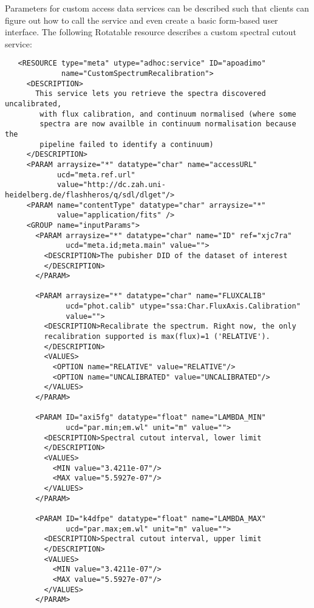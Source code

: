 \documentclass[11pt,a4paper]{ivoa}
\begin{document}
Parameters for custom access data services can be described such that
clients can figure out how to call the service and even create a basic
form-based user interface. The following Rotatable resource describes
a custom spectral cutout service:
{\small
\begin{verbatim}
   <RESOURCE type="meta" utype="adhoc:service" ID="apoadimo" 
             name="CustomSpectrumRecalibration">
     <DESCRIPTION>
       This service lets you retrieve the spectra discovered uncalibrated,
        with flux calibration, and continuum normalised (where some 
        spectra are now availble in continuum normalisation because the 
        pipeline failed to identify a continuum)
     </DESCRIPTION>
     <PARAM arraysize="*" datatype="char" name="accessURL"
            ucd="meta.ref.url"
            value="http://dc.zah.uni-heidelberg.de/flashheros/q/sdl/dlget"/>
     <PARAM name="contentType" datatype="char" arraysize="*" 
            value="application/fits" />
     <GROUP name="inputParams">
       <PARAM arraysize="*" datatype="char" name="ID" ref="xjc7ra"
              ucd="meta.id;meta.main" value="">
         <DESCRIPTION>The pubisher DID of the dataset of interest
         </DESCRIPTION>
       </PARAM>

       <PARAM arraysize="*" datatype="char" name="FLUXCALIB"
              ucd="phot.calib" utype="ssa:Char.FluxAxis.Calibration"
              value="">
         <DESCRIPTION>Recalibrate the spectrum. Right now, the only
         recalibration supported is max(flux)=1 ('RELATIVE').
         </DESCRIPTION>
         <VALUES>
           <OPTION name="RELATIVE" value="RELATIVE"/>
           <OPTION name="UNCALIBRATED" value="UNCALIBRATED"/>
         </VALUES>
       </PARAM>

       <PARAM ID="axi5fg" datatype="float" name="LAMBDA_MIN"
              ucd="par.min;em.wl" unit="m" value="">
         <DESCRIPTION>Spectral cutout interval, lower limit
         </DESCRIPTION>
         <VALUES>
           <MIN value="3.4211e-07"/>
           <MAX value="5.5927e-07"/>
         </VALUES>
       </PARAM>

       <PARAM ID="k4dfpe" datatype="float" name="LAMBDA_MAX"
              ucd="par.max;em.wl" unit="m" value="">
         <DESCRIPTION>Spectral cutout interval, upper limit
         </DESCRIPTION>
         <VALUES>
           <MIN value="3.4211e-07"/>
           <MAX value="5.5927e-07"/>
         </VALUES>
       </PARAM>


\end{verbatim}}
\end{document}
